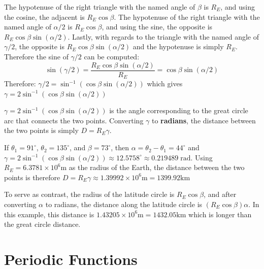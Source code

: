 \documentclass{article}
\begin{document}
The hypotenuse of the right triangle with the named angle of \(\beta\) is \(R_E\), and using the cosine, the adjacent is \(R_E \cos\beta\). The hypotenuse of the right triangle with the named angle of \(\alpha/2\) is \(R_E \cos\beta\), and using the sine, the opposite is \(R_E \cos\beta \sin(\alpha/2)\). Lastly, with regards to the triangle with the named angle of \(\gamma/2\), the opposite is \(R_E \cos\beta \sin(\alpha/2)\) and the hypotenuse is simply \(R_E\). Therefore the sine of \(\gamma/2\) can be computed:
\[\sin(\gamma/2) = \frac{R_E \cos\beta \sin(\alpha/2)}{R_E} = \cos\beta \sin(\alpha/2)\]
Therefore: \(\gamma/2 = \sin^{-1}(\cos\beta \sin(\alpha/2))\) which gives \(\gamma = 2\sin^{-1}(\cos\beta \sin(\alpha/2))\)

\(\gamma = 2\sin^{-1}(\cos\beta \sin(\alpha/2))\) is the angle corresponding to the great circle arc that connects the two points. Converting \(\gamma\) to {\bf radians}, the distance between the two points is simply \(D = R_E \gamma\).

If \(\theta_1 = 91^\circ\), \(\theta_2 = 135^\circ\), and \(\beta = 73^\circ\), then \(\alpha = \theta_2 - \theta_1 = 44^\circ\) and \(\gamma = 2\sin^{-1}(\cos\beta \sin(\alpha/2)) \approx 12.5758^\circ \approx 0.219489\;\text{rad}\). Using \(R_E = 6.3781 \times 10^6\text{m}\) as the radius of the Earth, the distance between the two points is therefore \(D = R_E \gamma \approx 1.39992 \times 10^6\text{m} = 1399.92\text{km}\)

To serve as contrast, the radius of the latitude circle is \(R_E\cos\beta\), and after converting \(\alpha\) to radians, the distance along the latitude circle is \((R_E\cos\beta)\alpha\). In this example, this distance is \(1.43205 \times 10^6\text{m} = 1432.05\text{km}\) which is longer than the great circle distance.



\section{Periodic Functions}


\end{document}
